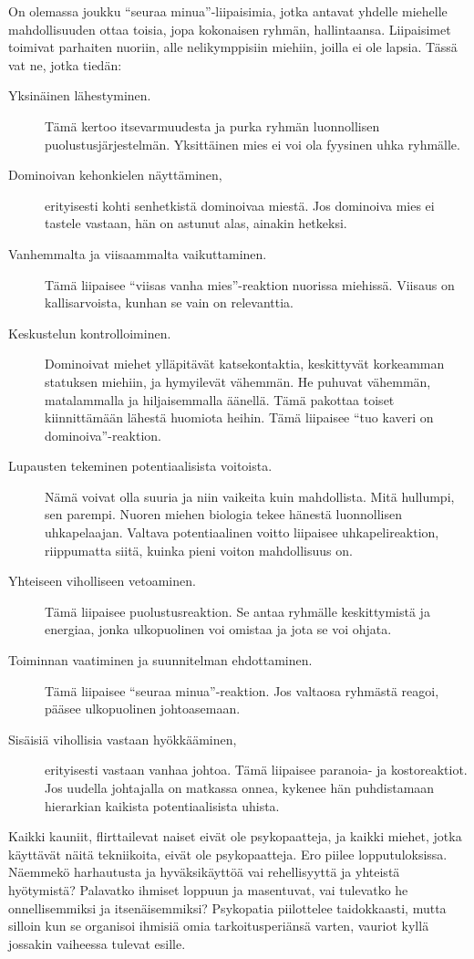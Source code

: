 On olemassa joukku ``seuraa minua''-liipaisimia, jotka antavat yhdelle miehelle mahdollisuuden ottaa toisia, jopa kokonaisen ryhmän, hallintaansa. Liipaisimet toimivat parhaiten nuoriin, alle nelikymppisiin miehiin, joilla ei ole lapsia. Tässä vat ne, jotka tiedän:
\begin{description}
\item[Yksinäinen lähestyminen.] Tämä kertoo itsevarmuudesta ja purka ryhmän luonnollisen puolustusjärjestelmän. Yksittäinen mies ei voi ola fyysinen uhka ryhmälle.
\item[Dominoivan kehonkielen näyttäminen,] erityisesti kohti senhetkistä dominoivaa miestä. Jos dominoiva mies ei tastele vastaan, hän on astunut alas, ainakin hetkeksi.
\item[Vanhemmalta ja viisaammalta vaikuttaminen.] Tämä liipaisee ``viisas vanha mies''-reaktion nuorissa miehissä. Viisaus on kallisarvoista, kunhan se vain on relevanttia.
\item[Keskustelun kontrolloiminen.] Dominoivat miehet ylläpitävät katsekontaktia, keskittyvät korkeamman statuksen miehiin, ja hymyilevät vähemmän. He puhuvat vähemmän, matalammalla ja hiljaisemmalla äänellä. Tämä pakottaa toiset kiinnittämään lähestä huomiota heihin. Tämä liipaisee ``tuo kaveri on dominoiva''-reaktion.
\item[Lupausten tekeminen potentiaalisista voitoista.] Nämä voivat olla suuria ja niin vaikeita kuin mahdollista. Mitä hullumpi, sen parempi. Nuoren miehen biologia tekee hänestä luonnollisen uhkapelaajan. Valtava potentiaalinen voitto liipaisee uhkapelireaktion, riippumatta siitä, kuinka pieni voiton mahdollisuus on.
\item[Yhteiseen viholliseen vetoaminen.] Tämä liipaisee puolustusreaktion. Se antaa ryhmälle keskittymistä ja energiaa, jonka ulkopuolinen voi omistaa ja jota se voi ohjata.
\item[Toiminnan vaatiminen ja suunnitelman ehdottaminen.] Tämä liipaisee ``seuraa minua''-reaktion. Jos valtaosa ryhmästä reagoi, pääsee ulkopuolinen johtoasemaan.
\item[Sisäisiä vihollisia vastaan hyökkääminen,] erityisesti vastaan vanhaa johtoa. Tämä liipaisee paranoia- ja kostoreaktiot. Jos uudella johtajalla on matkassa onnea, kykenee hän puhdistamaan hierarkian kaikista potentiaalisista uhista.
\end{description}
Kaikki kauniit, flirttailevat naiset eivät ole psykopaatteja, ja kaikki miehet, jotka käyttävät näitä tekniikoita, eivät ole psykopaatteja. Ero piilee lopputuloksissa. Näemmekö harhautusta ja hyväksikäyttöä vai rehellisyyttä ja yhteistä hyötymistä? Palavatko ihmiset loppuun ja masentuvat, vai tulevatko he onnellisemmiksi ja itsenäisemmiksi? Psykopatia piilottelee taidokkaasti, mutta silloin kun se organisoi ihmisiä omia tarkoitusperiänsä varten, vauriot kyllä jossakin vaiheessa tulevat esille.

